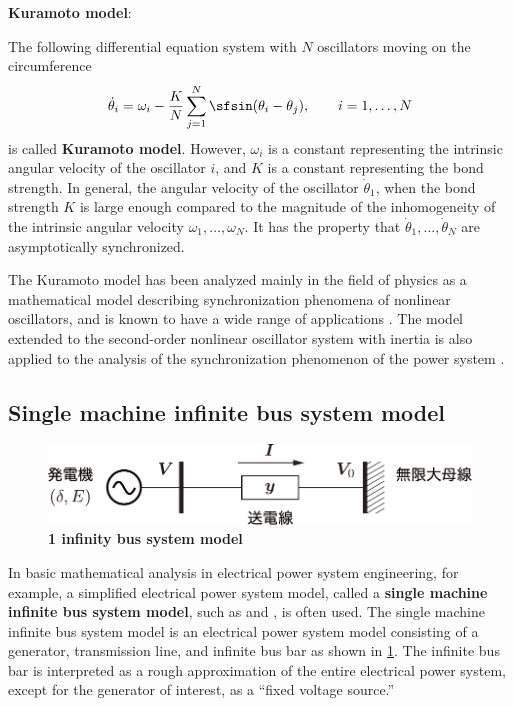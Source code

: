 \documentclass[graybox, envcountchap]{svmult}
\begin{document}
\begin{COLUMN}

\noindent\textbf{Kuramoto model}:

The following differential equation system with $N$ oscillators moving on the circumference
\[
\dot{\theta}_i = \omega_i - \frac{K}{N} \sum_{j=1}^N \sfsin (\theta_i - \theta_j),
\qquad
i=1,\ldots,N
\]
is called \textbf{Kuramoto model}. 
However, $\omega_i$ is a constant representing the intrinsic angular velocity of the oscillator $i$, and $K$ is a constant representing the bond strength. 
In general, the angular velocity of the oscillator $\dot{\theta}_1$, when the bond strength $ K $ is large enough compared to the magnitude of the inhomogeneity of the intrinsic angular velocity $\omega_1,\ldots,\omega_N$. It has the property that $\dot{\theta}_1,\ldots,\dot{\theta}_N$ are asymptotically synchronized.


The Kuramoto model has been analyzed mainly in the field of physics as a mathematical model describing synchronization phenomena of nonlinear oscillators, and is known to have a wide range of applications \cite{kuramoto1975self,kuramoto2003chemical}.
The model extended to the second-order nonlinear oscillator system with inertia is also applied to the analysis of the synchronization phenomenon of the power system \cite{dorfler2012synchronization,dorfler2013synchronization,nagata2014node,nishikawa2015comparative}.
\end{COLUMN}




\subsection{Single machine infinite bus system model}\label{sec:onemachine}

\begin{figure}[t]
\centering
\includegraphics[width = .70\linewidth]{figs/inf1bus}
\medskip
\caption{\textbf{1 infinity bus system model}}
\label{fig:inf1bus}
\medskip
\end{figure}

In basic mathematical analysis in electrical power system engineering, for example, a simplified electrical power system model, called a \textbf{single machine infinite bus system model}, such as \cite[Section 1.3]{taniguchi2011power} and \cite[Section 6.3, Section 8.3]{kato2017electric}, is often used. 
The single machine infinite bus system model is an electrical power system model consisting of a generator, transmission line, and infinite bus bar as shown in \ref{fig:inf1bus}.
The infinite bus bar is interpreted as a rough approximation of the entire electrical power system, except for the generator of interest, as a “fixed voltage source.”
\end{document}
